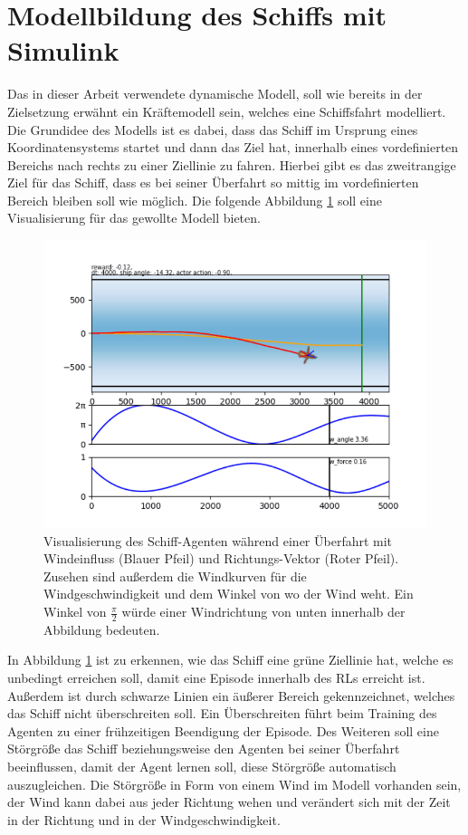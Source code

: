 \documentclass[]{iat}
\begin{document}
\section{Modellbildung des Schiffs mit Simulink} \label{sec:imp_simulink}
Das in dieser Arbeit verwendete dynamische Modell, soll wie bereits in der Zielsetzung erwähnt ein Kräftemodell sein, welches eine Schiffsfahrt modelliert. Die Grundidee des Modells ist es dabei, dass das Schiff im Ursprung eines Koordinatensystems startet und dann das Ziel hat, innerhalb eines vordefinierten Bereichs nach rechts zu einer Ziellinie zu fahren. Hierbei gibt es das zweitrangige Ziel für das Schiff, dass es bei seiner Überfahrt so mittig im vordefinierten Bereich bleiben soll wie möglich. Die folgende Abbildung \ref*{abb:boat_frame_example_2} soll eine Visualisierung für das gewollte Modell bieten.
\begin{figure}[H]
    \includegraphics[width=\textwidth]{graphics/boat_frame_example_2.png}
    \centering
    \caption{Visualisierung des Schiff-Agenten während einer Überfahrt mit Windeinfluss (Blauer Pfeil) und Richtungs-Vektor (Roter Pfeil). Zusehen sind außerdem die Windkurven für die Windgeschwindigkeit und dem Winkel von wo der Wind weht. Ein Winkel von $\frac{\pi}{2}$ würde einer Windrichtung von unten innerhalb der Abbildung bedeuten.}
    \label{abb:boat_frame_example_2}
\end{figure}
In Abbildung \ref*{abb:boat_frame_example_2} ist zu erkennen, wie das Schiff eine grüne Ziellinie hat, welche es unbedingt erreichen soll, damit eine Episode innerhalb des RLs erreicht ist. Außerdem ist durch schwarze Linien ein äußerer Bereich gekennzeichnet, welches das Schiff nicht überschreiten soll. Ein Überschreiten führt beim Training des Agenten zu einer frühzeitigen Beendigung der Episode. Des Weiteren soll eine Störgröße das Schiff beziehungsweise den Agenten bei seiner Überfahrt beeinflussen, damit der Agent lernen soll, diese Störgröße automatisch auszugleichen. Die Störgröße in Form von einem Wind im Modell vorhanden sein, der Wind kann dabei aus jeder Richtung wehen und verändert sich mit der Zeit in der Richtung und in der Windgeschwindigkeit.\\
\end{document}

